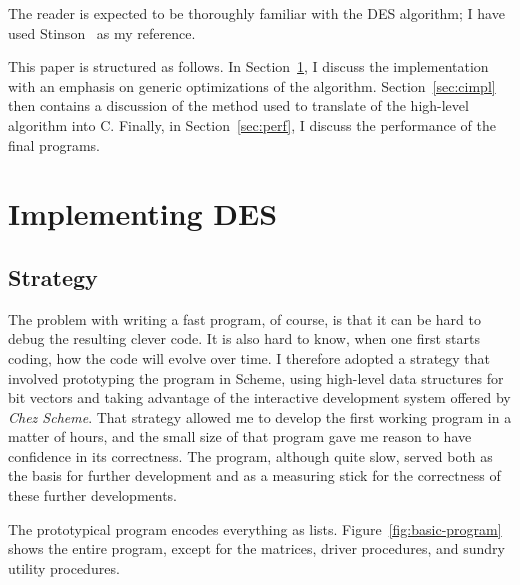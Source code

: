 The reader is expected to be thoroughly familiar with the DES algorithm;
I have used Stinson~\cite{Stinson} as my reference.

This paper is structured as follows.  In Section~\ref{sec:impl}, I discuss
the implementation with an emphasis on generic optimizations of the
algorithm.  Section~\ref{sec:cimpl} then contains a discussion of the
method used to translate of the high-level algorithm into C.  Finally,
in Section~\ref{sec:perf}, I discuss the performance of the final
programs.


\section{Implementing DES}
\label{sec:impl}

\subsection{Strategy}

The problem with writing a fast program, of course, is that it can be
hard to debug the resulting clever code.  It is also hard to know, when
one first starts coding, how the code will evolve over time.  I
therefore adopted a strategy that involved prototyping the
program in Scheme, using high-level data structures for bit vectors and taking
advantage of the
interactive development system offered by {\em Chez Scheme}.  That
strategy allowed me to develop the first working program in a matter of
hours, and the small size of that program gave me reason to have
confidence in its correctness.  The program, although quite slow, served
both as the basis for further development and as a measuring stick for
the correctness of these further developments.

The prototypical program encodes everything as lists.
Figure~\ref{fig:basic-program} shows the entire program, except for the
matrices, driver procedures, and sundry utility procedures.

